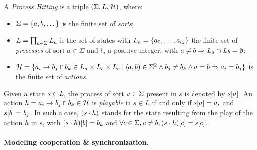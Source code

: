 \begin{definition}\label{def:PH}
A \emph{Process Hitting} is a triple $(\Sigma,L,\mathcal{H})$, where:
\begin{itemize}
\item $\Sigma = \{a,b,\dots\}$ is the finite set of \emph{sorts};
\item $L = \prod_{a\in\Sigma} L_a$ is the set of states with $L_a = \{a_0,\dots,a_{l_a}\}$
the finite set of \emph{processes} of sort $a\in\Sigma$ and $l_a$ a positive integer, with $a\neq b\Rightarrow L_a \cap L_b = \emptyset$;
\item $\mathcal{H} = \{ a_i\rightarrow b_j\Rsh b_k \in L_a \times L_b \times L_b \mid (a,b) \in \Sigma^2
  \wedge b_j\neq b_k \wedge a=b\Rightarrow a_i=b_j\}$ is the finite set of \emph{actions}.
\end{itemize}
\end{definition}

\noindent
Given a state $s\in L$, the process of sort $a\in\Sigma$ present in $s$ is denoted by ${s[a]}$.
An action $h=a_i\rightarrow b_j\Rsh b_k \in \mathcal{H}$ is \emph{playable} in $s \in L$ if and only if ${s[a]}=a_i$ and ${s[b]} = b_j$.
In such a case, $(s\cdot h)$ stands for the state resulting from the play of the action $h$ in $s$, with
${(s\cdot h)[b]} = b_k$ and $\forall c \in \Sigma, c \neq b, {(s\cdot h)[c]} = {s[c]}$.

\paragraph{Modeling cooperation \& synchronization.}


